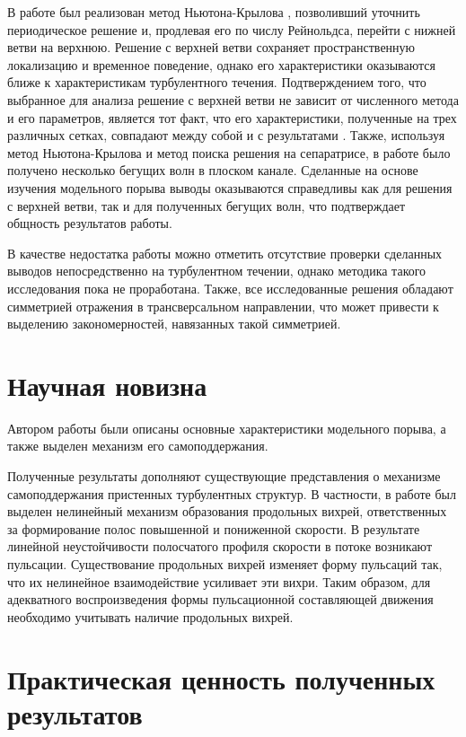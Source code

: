 В работе был реализован метод Ньютона-Крылова \cite{Viswanath2007, Dijkstra2014}, позволивший уточнить периодическое решение и, продлевая его по числу Рейнольдса, перейти с нижней ветви на верхнюю. Решение с верхней ветви сохраняет пространственную локализацию и временное поведение, однако его характеристики оказываются ближе к характеристикам турбулентного течения. Подтверждением того, что выбранное для анализа решение с верхней ветви не зависит от численного метода и его параметров, является тот факт, что его характеристики, полученные на трех различных сетках, совпадают между собой и с результатами \cite{Avila2013}. Также, используя метод Ньютона-Крылова и метод поиска решения на сепаратрисе, в работе было получено несколько бегущих волн в плоском канале. Сделанные на основе изучения модельного порыва выводы оказываются справедливы как для решения с верхней ветви, так и для полученных бегущих волн, что подтверждает общность результатов работы. 

В качестве недостатка работы можно отметить отсутствие проверки сделанных выводов непосредственно на турбулентном течении, однако методика такого исследования пока не проработана. Также, все исследованные решения обладают симметрией отражения в трансверсальном направлении, что может привести к выделению закономерностей, навязанных такой симметрией. 


\section{Научная новизна}

Автором работы были описаны основные характеристики модельного порыва, а также выделен механизм его самоподдержания. 

Полученные результаты дополняют существующие представления о механизме самоподдержания пристенных турбулентных структур. В частности, в работе был выделен нелинейный механизм образования продольных вихрей, ответственных за формирование полос повышенной и пониженной скорости. В результате линейной неустойчивости полосчатого профиля скорости в потоке возникают пульсации. Существование продольных вихрей изменяет форму пульсаций так, что их нелинейное взаимодействие усиливает эти вихри. Таким образом, для адекватного воспроизведения формы пульсационной составляющей движения необходимо учитывать наличие продольных вихрей. 

\section{Практическая ценность полученных результатов}

